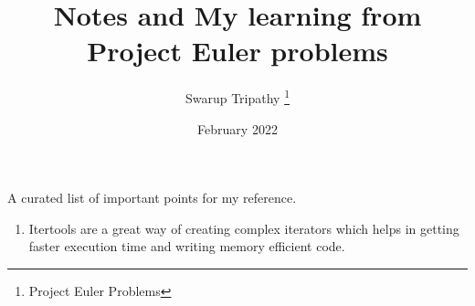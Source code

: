\documentclass[11pt]{article}
\title{Notes and My learning from Project Euler problems}
\author{Swarup Tripathy \thanks{Project Euler Problems}}
\date{February 2022}
\begin{document}
    \maketitle
    A curated list of important points for my reference.\\
    \begin{enumerate}
        \item Itertools are a great way of creating complex iterators which helps in getting faster execution time and writing memory efficient code.
    \end{enumerate}
\end{document}
